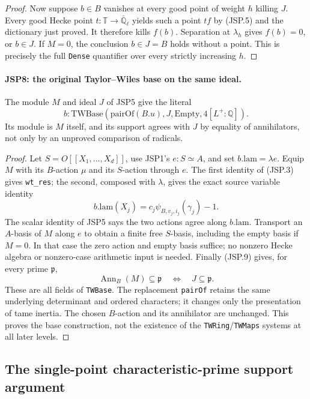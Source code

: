 \begin{proof}
Now suppose $b\in B$ vanishes at every good point of weight
$h$ killing $J$. Every good Hecke point
$t:\mathbb T\to\overline{\mathbb Q}_\ell$ yields such
a point $tf$ by (JSP.5) and the dictionary just proved.
It therefore kills $f(b)$. Separation at $\lambda_h$ gives
$f(b)=0$, or $b\in J$. If $M=0$, the conclusion
$b\in J=B$ holds without a point. This is precisely the full
\texttt{Dense} quantifier over every strictly increasing $h$.
\end{proof}

\paragraph{JSP8: the original Taylor--Wiles base on the same ideal.}
\label{claim:JSP8}
The module $M$ and ideal $J$ of JSP5 give the literal
\[
 b:\mathrm{TWBase}(\mathrm{pairOf}(B.u),J,
                         \mathrm{Empty},4[L^+:\mathbb Q]).
 \tag{JSP.13}
\]
Its module is $M$ itself, and its support agrees with $J$
by equality of annihilators, not only by an unproved comparison
of radicals.
\begin{proof}
Let $S=O[[X_1,\ldots,X_d]]$, use JSP1's $e:S\simeq A$,
and set $b.\mathrm{lam}=\lambda e$.
Equip $M$ with its $B$-action $\mu$ and its $S$-action
through $e$. The first identity of (JSP.3) gives
\texttt{wt\_res}; the second, composed with $\lambda$,
gives the exact source variable identity
\[
 b.\mathrm{lam}(X_j)=c_j\psi_{B,v_j,i_j}(\gamma_j)-1.
\]
The scalar identity of JSP5 says the two actions agree along
$b.\mathrm{lam}$. Transport an $A$-basis of $M$ along $e$
to obtain a finite free $S$-basis, including the empty basis
if $M=0$. In that case the zero action and empty basis suffice;
no nonzero Hecke algebra or nonzero-case arithmetic input is needed.
Finally (JSP.9) gives, for every prime $\mathfrak p$,
\[
 \operatorname{Ann}_B(M)\subseteq\mathfrak p
             \quad\Longleftrightarrow\quad J\subseteq\mathfrak p.
\]
These are all fields of \texttt{TWBase}. The replacement
\texttt{pairOf} retains the same underlying determinant and
ordered characters; it changes only the presentation of tame
inertia. The chosen $B$-action and its annihilator are unchanged.
This proves the base construction, not the existence of the
\texttt{TWRing}/\texttt{TWMaps} systems at all later levels.
\end{proof}

\subsection{The single-point characteristic-prime support argument}

